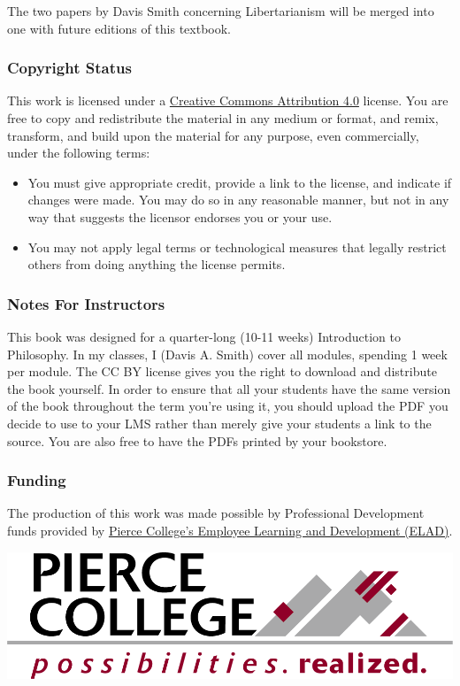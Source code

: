 The two papers by Davis Smith concerning Libertarianism will be merged into one with future editions of this textbook.

\subsubsection{Copyright Status}

This work is licensed under a \href{https://creativecommons.org/licenses/by/4.0/}{Creative Commons Attribution 4.0} license.
You are free to copy and redistribute the material in any medium or format, and  remix, transform, and build upon the material for any purpose, even commercially, under the following terms:
\begin{itemize}
\item You must give appropriate credit, provide a link to the license, and indicate if changes were made. You may do so in any reasonable manner, but not in any way that suggests the licensor endorses you or your use.
\item You may not apply legal terms or technological measures that legally restrict others from doing anything the license permits.
\end{itemize}

\subsubsection{Notes For Instructors}

This book was designed for a quarter-long (10-11 weeks) Introduction to Philosophy. In my classes, I (Davis A. Smith) cover all modules, spending 1 week per module. The CC BY license gives you the right to download and distribute the book yourself. In order to ensure that all your students have the same version of the book throughout the term you’re using it, you should upload the PDF you decide to use to your LMS rather than merely give your students a link to the source. You are also free to have the PDFs printed by your bookstore.

\subsubsection{Funding}

The production of this work was made possible by Professional Development funds provided by \href{https://www.pierce.ctc.edu/elad}{Pierce College's Employee Learning and Development (ELAD)}. 


\includegraphics{marcom-PierceCollege-Logo.png}


\bigskip
